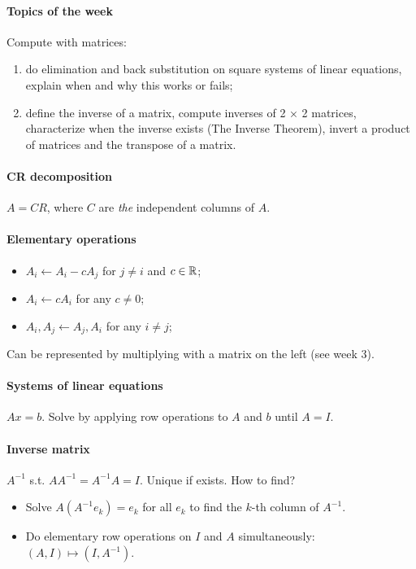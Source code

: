 \documentclass{article}
\begin{document}
\paragraph{Topics of the week} Compute with matrices:  

\begin{enumerate}
    \item do elimination and back substitution on square systems of linear equations, explain when and why this works or fails;
    \item define the inverse of a matrix, compute inverses of 2 × 2 matrices, characterize when the inverse exists (The Inverse Theorem), invert a product of matrices and the transpose of a matrix.
\end{enumerate}

\paragraph{CR decomposition} $A = CR$, where $C$ are \textit{the} independent columns of $A$.

\paragraph{Elementary operations}
\begin{itemize}
    \item $\boxed{A_i \gets A_i - c A_j}$ for $j \neq i$ and $c \in \mathbb{R}$;
    \item $\boxed{A_i \gets c A_i}$ for any $c \neq 0$;
    \item $\boxed{A_i, A_j \gets A_j, A_i}$ for any $i \neq j$;
\end{itemize}

Can be represented by multiplying with a matrix on the left (see week 3).

\paragraph{Systems of linear equations} $Ax = b$. Solve by applying row operations to $A$ and $b$ until $A = I$.

\paragraph{Inverse matrix} $A^{-1}$ s.t. $A A^{-1} = A^{-1} A = I$. Unique if exists. How to find?

\begin{itemize}
    \item Solve $A (A^{-1} e_k) = e_k$ for all $e_k$ to find the $k$-th column of $A^{-1}$.
    \item Do elementary row operations on $I$ and $A$ simultaneously: $(A, I) \mapsto (I, A^{-1})$.
\end{itemize}
\end{document}
